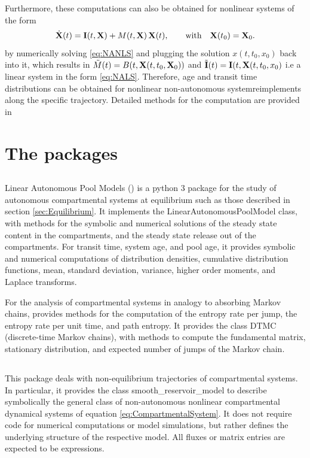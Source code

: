Furthermore, these computations can also be obtained for nonlinear systems of the form
\begin{equation} \label{eq:NANLS}
\dot{\mathbf{X}}(t) = \mathbf{I}(t, \mathbf{X}) + M(t, \mathbf{X}) \, \mathbf{X}(t), \qquad  \mathrm{with} \quad \mathbf{X}(t_0) = \mathbf{X}_0.
\end{equation}
by numerically solving \eqref{eq:NANLS} and plugging the solution $x(t, t_0,
x_0)$ back into it, which results in $\tilde{M}(t)=B(t, \mathbf{X}(t, t_0,\mathbf{X}_0))$ and
$\tilde{\mathbf{I}}(t)=\mathbf{I}(t,\mathbf{X}(t, t_0,x_0)$  i.e a linear system in the form
\eqref{eq:NALS}. 
Therefore,  age and transit time
distributions can be obtained for nonlinear non-autonomous systemreimplements along the
specific trajectory. Detailed methods for the computation are provided in
\citet{Metzler2018PNAS}

\section{The \python packages}
\label{sec:PythonPackages}
\subsection{\LAPM}
Linear Autonomous Pool Models (\LAPM) is a python 3 package for the study of autonomous compartmental systems at equilibrium such as those described in section \ref{sec:Equilibrium}. 
It implements the LinearAutonomousPoolModel class, with methods for the
symbolic and numerical solutions of the steady state content in the compartments, and the steady state release out of the compartments. For transit time, system age, and pool age, it provides symbolic and numerical computations of distribution densities, cumulative distribution functions, mean, standard deviation,           variance, higher order moments, and Laplace transforms. 

For the analysis of compartmental systems in analogy to absorbing Markov chains, \LAPM provides methods for the computation of the entropy rate per jump, the entropy rate per unit time, and path entropy. It provides the class DTMC (discrete-time Markov chains), with methods to compute the fundamental matrix, stationary distribution, and expected number of jumps of the Markov chain.

\subsection{\CompartmentalSystems}
This package deals with non-equilibrium trajectories of compartmental systems.
In particular, it provides the class smooth\_reservoir\_model to describe
symbolically the general class of non-autonomous nonlinear compartmental
dynamical systems of equation \eqref{eq:CompartmentalSystem}. It does not
require code for numerical computations or model simulations, but rather defines the underlying structure of the respective model. 
All fluxes or matrix entries are expected to be \sympy{} 
expressions. 

